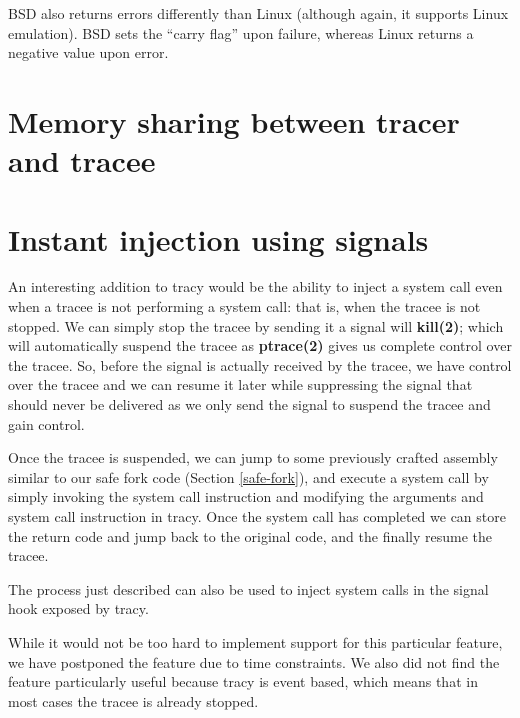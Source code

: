 \documentclass[a4paper, 10pt]{report}
\begin{document}
BSD also returns errors differently than Linux (although again, it supports
Linux emulation). BSD sets the ``carry flag'' upon failure, whereas Linux
returns a negative value upon error.

\section{Memory sharing between tracer and tracee}
\label{memory-share}


\section{Instant injection using signals}
\label{instant-inject}

An interesting addition to tracy would be the ability to inject a system call
even when a tracee is not performing a system call: that is, when the tracee
is not stopped. We can simply stop the tracee by sending it a signal will
\textbf{kill(2)}; which will automatically suspend the tracee as
\textbf{ptrace(2)} gives us complete control over the tracee.
So, before the signal is actually received by the tracee, we have control
over the tracee and we can resume it later while suppressing the signal that
should never be delivered as we only send the signal to suspend the tracee and
gain control.

Once the tracee is suspended, we can jump to some previously crafted assembly
similar to our safe fork code (Section \ref{safe-fork}), and execute a system
call by simply invoking the system call instruction and modifying the
arguments and system call instruction in tracy. Once the system call
has completed we can store the return code and jump back to the original code,
and the finally resume the tracee.

The process just described can also be used to inject system calls
in the signal hook exposed by tracy.

While it would not be too hard to implement support for this particular
feature, we have postponed the feature due to time constraints. We also
did not find the feature particularly useful because tracy is event based,
which means that in most cases the tracee is already stopped.



\end{document}
